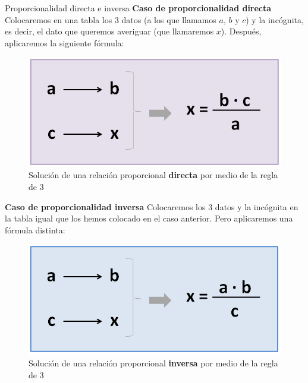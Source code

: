 \begin{infocard}{Proporcionalidad directa e inversa}
    \textbf{Caso de proporcionalidad directa}
    Colocaremos en una tabla los 3 datos (a los que llamamos $a$, $b$ y $c$) y la incógnita, es decir, el dato que queremos averiguar (que llamaremos $x$). Después, aplicaremos la siguiente fórmula:
    \begin{figure}[H]
        \centering
        \includegraphics[width=.9\linewidth]{../images/formula-regla-de-3-img1}
        \caption{Solución de una relación proporcional \textbf{directa} por medio de la regla de 3}
        \label{fig:}
    \end{figure}
    \tcblower
    \textbf{Caso de proporcionalidad inversa}
    Colocaremos los 3 datos y la incógnita en la tabla igual que los hemos colocado en el caso anterior. Pero aplicaremos una fórmula distinta:
    \begin{figure}[H]
        \centering
        \includegraphics[width=.9\linewidth]{../images/formula-regla-de-3-img3}
        \caption{Solución de una relación proporcional \textbf{inversa} por medio de la regla de 3}
        \label{fig:}
    \end{figure}
\end{infocard}
